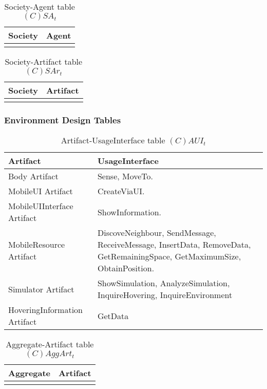 \begin{table}[H]
	\centering
	\begin{tabular}{|p{4cm}|p{8cm}|}
			\hline
			\textbf{Society} & \textbf{Agent} \\
			\hline
			& \\
			\hline
		\end{tabular}
	\caption{Society-Agent table $(C)SA_t$}
	\label{tab:csat}
\end{table}

\begin{table}[H]
	\centering
	\begin{tabular}{|p{4cm}|p{8cm}|}
			\hline
			\textbf{Society} & \textbf{Artifact} \\
			\hline
			& \\
			\hline
		\end{tabular}
	\caption{Society-Artifact table $(C)SAr_t$}
	\label{tab:csart}
\end{table}

\subsubsection{Environment Design Tables}

\begin{table}[H]
	\centering
	\begin{tabular}{|p{4cm}|p{8cm}|}
			\hline
			\textbf{Artifact} & \textbf{UsageInterface} \\
			\hline
			Body Artifact & Sense, MoveTo. \\
			\hline
			MobileUI Artifact & CreateViaUI. \\
			\hline
			MobileUIInterface Artifact & ShowInformation. \\
			\hline
      MobileResource Artifact & DiscoveNeighbour, SendMessage, ReceiveMessage,
      InsertData, RemoveData, GetRemainingSpace, GetMaximumSize,
      ObtainPosition. \\
			\hline
      Simulator Artifact & ShowSimulation, AnalyzeSimulation, InquireHovering,
      InquireEnvironment \\
			\hline
			HoveringInformation Artifact & GetData \\
			\hline
		\end{tabular}
	\caption{Artifact-UsageInterface table $(C)AUI_t$}
	\label{tab:cauit}
\end{table}

\begin{table}[H]
	\centering
	\begin{tabular}{|p{4cm}|p{8cm}|}
			\hline
			\textbf{Aggregate} & \textbf{Artifact} \\
			\hline
			& \\
			\hline
		\end{tabular}
	\caption{Aggregate-Artifact table $(C)AggArt_t$}
	\label{tab:caggartt}
\end{table}

